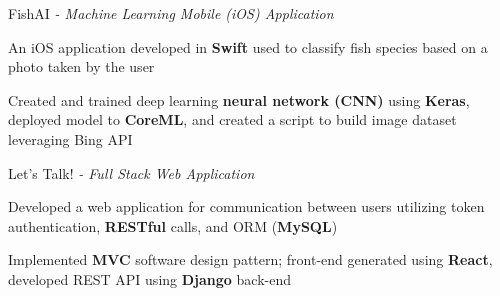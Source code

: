 \begin{siderulesProj}
\par\addvspace{-1.2ex}
\begin{cventriesproject}
  \cventryproject
  {FishAI  \hspace{0.15em}\bodyfontlight\itshape{- Machine Learning Mobile (iOS) Application}}
  {
    \begin{cvskillitems}
      \item {An iOS application developed in \textbf{Swift} used to classify fish species based on a photo taken by the user}
      \item {Created and trained deep learning \textbf{neural network (CNN)} using \textbf{Keras}, deployed model to \textbf{CoreML}, and created a script to build image dataset leveraging Bing API}
    \end{cvskillitems}
  }
  \cventryproject
    {Let's Talk!  \hspace{0.15em}\bodyfontlight\itshape{- Full Stack Web Application}}
    {
      \begin{cvskillitems}
        \item {Developed a web application for communication between users utilizing token authentication, \textbf{RESTful} calls, and ORM (\textbf{MySQL})}
        \item {Implemented \textbf{MVC} software design pattern; front-end generated using \textbf{React}, developed REST API using \textbf{Django} back-end}
      \end{cvskillitems}
    }
\end{cventriesproject}
\end{siderulesProj}
